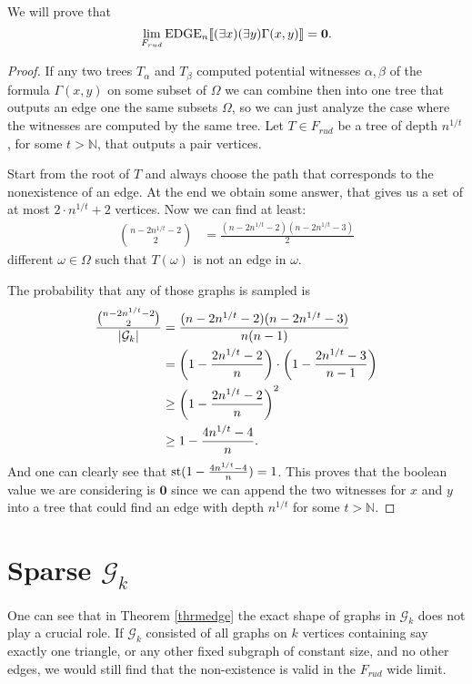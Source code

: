 \begin{thrm}\label{thrmedge}
We will prove that \[\lim_{F_{rud}}\text{EDGE}_n\llbracket(\exists x)(\exists y)\Gamma(x,y)\rrbracket=\textbf{0}.\]
\end{thrm}
\begin{proof}
If any two trees $T_\alpha$ and $T_\beta$ computed potential witnesses $\alpha,\beta$ of the formula $\Gamma(x,y)$ on some subset of $\Omega$ we can combine then into one tree that outputs an edge one the same subsets $\Omega$, so we can just analyze the case where the witnesses are computed by the same tree. Let $T\in F_{rud}$ be a tree of depth $n^{1/t}$, for some $t>\mathbb{N}$, that outputs a pair vertices.


Start from the root of $T$ and always choose the path that corresponds to the nonexistence of an edge. At the end we obtain some answer, that gives us a set of at most $2 \cdot n^{1/t}+2$ vertices. Now we can find at least: 
\begin{align}
\binom{n-2n^{1/t}-2}{2}&=\frac{(n-2n^{1/t}-2)(n-2n^{1/t}-3)}{2}
\end{align}
different $\omega\in\Omega$ such that $T(\omega)$ is not an edge in $\omega$. 

The probability that any of those graphs is sampled is
\begin{align}
\frac{\binom{n-2n^{1/t}-2}{2}}{\left|{\mathcal{G}_k}\right|}&=\frac{(n-2n^{1/t}-2)(n-2n^{1/t}-3)}{n(n-1)}\\
&=\left(1-\frac{2n^{1/t}-2}{n}\right)\cdot\left(1-\frac{2n^{1/t}-3}{n-1}\right)\\
&\geq \left(1-\frac{2n^{1/t}-2}{n}\right)^2\\
&\geq 1-\frac{4n^{1/t}-4}{n}.
\end{align}
And one can clearly see that $\text{st}(1-\frac{4n^{1/t}-4}{n})=1$. This proves that the boolean value we are considering is $\textbf{0}$ since we can append the two witnesses for $x$ and $y$ into a tree that could find an edge with depth $n^{1/t}$ for some $t>\mathbb{N}$.
\end{proof}

\section{Sparse $\mathcal{G}_k$}

One can see that in Theorem \ref{thrmedge} the exact shape of graphs in $\mathcal{G}_k$ does not play a crucial role. If $\mathcal{G}_k$ consisted of all graphs on $k$ vertices containing say exactly one triangle, or any other fixed subgraph of constant size, and no other edges, we would still find that the non-existence is valid in the $F_{rud}$ wide limit.

